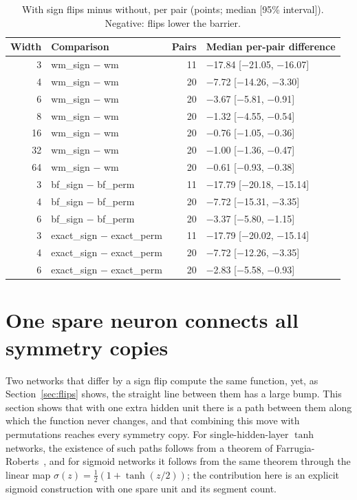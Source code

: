 \documentclass[11pt]{article}
\newcommand{\md}[1]{\textsf{#1}}
\begin{document}
\begin{table}[H]
\centering
\small
\caption{With sign flips minus without, per pair (points; median [95\% interval]). Negative: flips lower the barrier.}
\label{tab:q4diff}
\begin{tabular}{@{}rlrl@{}}
\toprule
Width & Comparison & Pairs & Median per-pair difference \\
\midrule
3 & \md{wm\_sign} $-$ \md{wm} & 11 & $-$17.84 [$-$21.05, $-$16.07] \\
4 & \md{wm\_sign} $-$ \md{wm} & 20 & $-$7.72 [$-$14.26, $-$3.30] \\
6 & \md{wm\_sign} $-$ \md{wm} & 20 & $-$3.67 [$-$5.81, $-$0.91] \\
8 & \md{wm\_sign} $-$ \md{wm} & 20 & $-$1.32 [$-$4.55, $-$0.54] \\
16 & \md{wm\_sign} $-$ \md{wm} & 20 & $-$0.76 [$-$1.05, $-$0.36] \\
32 & \md{wm\_sign} $-$ \md{wm} & 20 & $-$1.00 [$-$1.36, $-$0.47] \\
64 & \md{wm\_sign} $-$ \md{wm} & 20 & $-$0.61 [$-$0.93, $-$0.38] \\
3 & \md{bf\_sign} $-$ \md{bf\_perm} & 11 & $-$17.79 [$-$20.18, $-$15.14] \\
4 & \md{bf\_sign} $-$ \md{bf\_perm} & 20 & $-$7.72 [$-$15.31, $-$3.35] \\
6 & \md{bf\_sign} $-$ \md{bf\_perm} & 20 & $-$3.37 [$-$5.80, $-$1.15] \\
3 & \md{exact\_sign} $-$ \md{exact\_perm} & 11 & $-$17.79 [$-$20.02, $-$15.14] \\
4 & \md{exact\_sign} $-$ \md{exact\_perm} & 20 & $-$7.72 [$-$12.26, $-$3.35] \\
6 & \md{exact\_sign} $-$ \md{exact\_perm} & 20 & $-$2.83 [$-$5.58, $-$0.93] \\
\bottomrule
\end{tabular}
\end{table}

\section{One spare neuron connects all symmetry copies}


\label{sec:spare}

Two networks that differ by a sign flip compute the same function, yet, as Section~\ref{sec:flips} shows, the straight line between them has a large bump. This section shows that with one extra hidden unit there is a path between them along which the function never changes, and that combining this move with permutations reaches every symmetry copy. For single-hidden-layer $\tanh$ networks, the existence of such paths follows from a theorem of Farrugia-Roberts~\cite{farrugia2023functional}, and for sigmoid networks it follows from the same theorem through the linear map $\sigma(z) = \tfrac12(1+\tanh(z/2))$; the contribution here is an explicit sigmoid construction with one spare unit and its segment count.
\end{document}
